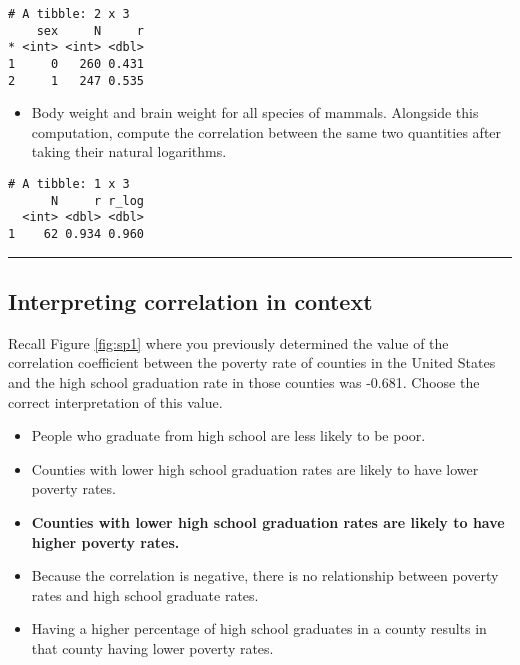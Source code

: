 \documentclass[
]{book}
\newenvironment{Shaded}{\begin{snugshade}}{\end{snugshade}}
\newcommand{\CommentTok}[1]{\textcolor[rgb]{0.56,0.35,0.01}{\textit{#1}}}
\newcommand{\DataTypeTok}[1]{\textcolor[rgb]{0.13,0.29,0.53}{#1}}
\newcommand{\KeywordTok}[1]{\textcolor[rgb]{0.13,0.29,0.53}{\textbf{#1}}}
\newcommand{\NormalTok}[1]{#1}
\newcommand{\OperatorTok}[1]{\textcolor[rgb]{0.81,0.36,0.00}{\textbf{#1}}}
\newcommand{\StringTok}[1]{\textcolor[rgb]{0.31,0.60,0.02}{#1}}
\providecommand{\tightlist}{%
  \setlength{\itemsep}{0pt}\setlength{\parskip}{0pt}}
\begin{document}
\begin{verbatim}
# A tibble: 2 x 3
    sex     N     r
* <int> <int> <dbl>
1     0   260 0.431
2     1   247 0.535
\end{verbatim}

\begin{itemize}
\tightlist
\item
  Body weight and brain weight for all species of mammals. Alongside this computation, compute the correlation between the same two quantities after taking their natural logarithms.
\end{itemize}

\begin{Shaded}
\end{Shaded}

\begin{verbatim}
# A tibble: 1 x 3
      N     r r_log
  <int> <dbl> <dbl>
1    62 0.934 0.960
\end{verbatim}

\begin{center}\rule{0.5\linewidth}{0.5pt}\end{center}

\hypertarget{interpreting-correlation-in-context}{%
\subsection*{Interpreting correlation in context}\label{interpreting-correlation-in-context}}

Recall Figure \ref{fig:sp1} where you previously determined the value of the correlation coefficient between the poverty rate of counties in the United States and the high school graduation rate in those counties was -0.681. Choose the correct interpretation of this value.

\begin{itemize}
\item
  People who graduate from high school are less likely to be poor.
\item
  Counties with lower high school graduation rates are likely to have lower poverty rates.
\item
  \textbf{Counties with lower high school graduation rates are likely to have higher poverty rates.}
\item
  Because the correlation is negative, there is no relationship between poverty rates and high school graduate rates.
\item
  Having a higher percentage of high school graduates in a county results in that county having lower poverty rates.
\end{itemize}
\end{document}
